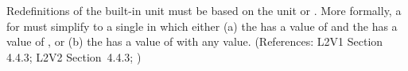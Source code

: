 Redefinitions of the built-in unit  must be based on the unit
 or .  More formally, a \UnitDefinition
for  must simplify to a single \Unit in which either (a) the
  has a value of  and the
  has a value of , or (b) the
  has a value of  with
any  value.  (References: L2V1 Section 4.4.3; L2V2
Section~4.4.3; )
